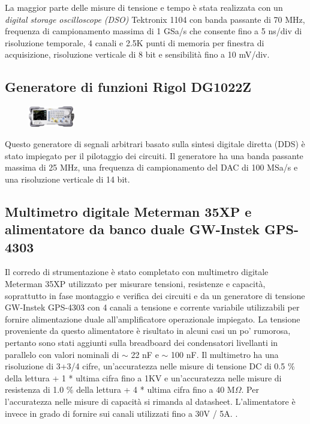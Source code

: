 \documentclass[journal]{IEEEtran}
\begin{document}
La maggior parte delle misure di tensione e tempo è stata realizzata con un \textit{digital storage oscilloscope (DSO)} Tektronix 1104 con banda passante di 70 MHz, frequenza di campionamento massima di 1 GSa/s che consente fino a 5 ns/div di risoluzione temporale, 4 canali e 2.5K punti di memoria per finestra di acquisizione, risoluzione verticale di 8 bit e sensibilità fino a 10 mV/div.
\cite{A}


\subsection{\textbf{Generatore di funzioni Rigol DG1022Z}}

\begin{figure}[h!]
  \centering
  \includegraphics[width=0.18\textwidth]{lab-reports/Schematics-and-graphics/RIGOL Gen.png}
\end{figure}

Questo generatore di segnali arbitrari basato sulla sintesi digitale diretta (DDS) è stato impiegato per il pilotaggio dei circuiti. Il generatore ha una banda passante massima di 25 MHz, una frequenza di campionamento del DAC di 100 MSa/s e una risoluzione verticale di 14 bit. 
\cite{B}


\subsection{\textbf{Multimetro digitale Meterman 35XP e alimentatore da banco duale GW-Instek GPS-4303}}
Il corredo di strumentazione è stato completato con multimetro digitale Meterman 35XP utilizzato per misurare tensioni, resistenze e capacità, soprattutto in fase montaggio e verifica dei circuiti e da un generatore di tensione GW-Instek GPS-4303 con 4 canali a tensione e corrente variabile utilizzabili per fornire alimentazione duale all'amplificatore operazionale impiegato. La tensione proveniente da questo alimentatore è risultato in alcuni casi un po' rumorosa, pertanto sono stati aggiunti sulla breadboard dei condensatori livellanti in parallelo con valori nominali di $\sim$ 22 nF e $\sim$ 100 nF. Il multimetro ha una risoluzione di 3+3/4 cifre, un'accuratezza nelle misure di tensione DC di 0.5 \% della lettura + 1 * ultima cifra fino a 1KV e un'accuratezza nelle misure di resistenza di 1.0 \% della lettura + 4 * ultima cifra fino a 40 M$\Omega$. Per l'accuratezza nelle misure di capacità si rimanda al datasheet. L'alimentatore è invece in grado di fornire sui canali utilizzati fino a 30V / 5A. \cite{C} \cite{C}.
\end{document}
